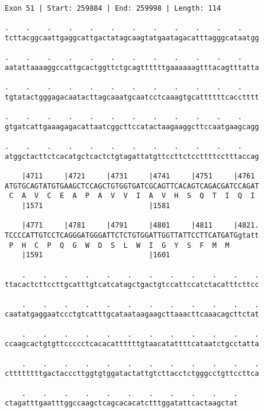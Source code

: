 \documentclass{article}
\begin{document}
\newpage
\begin{Verbatim}[fontfamily=courier]
Exon 51 | Start: 259884 | End: 259998 | Length: 114

.    .    .    .    .    .    .    .    .    .    .    .    
tcttacggcaattgaggcattgactatagcaagtatgaatagacatttagggcataatgg

.    .    .    .    .    .    .    .    .    .    .    .    
aatattaaaaggccattgcactggttctgcagttttttgaaaaaagtttacagtttatta

.    .    .    .    .    .    .    .    .    .    .    .    
tgtatactgggagacaatacttagcaaatgcaatcctcaaagtgcattttttcacctttt

.    .    .    .    .    .    .    .    .    .    .    .    
gtgatcattgaaagagacattaatcggcttccatactaagaaggcttccaatgaagcagg

.    .    .    .    .    .    .    .    .    .    .    .    
atggctacttctcacatgctcactctgtagattatgttccttctccttttcctttaccag

    |4711     |4721     |4731     |4741     |4751     |4761 
ATGTGCAGTATGTGAAGCTCCAGCTGTGGTGATCGCAGTTCACAGTCAGACGATCCAGAT
 C  A  V  C  E  A  P  A  V  V  I  A  V  H  S  Q  T  I  Q  I 
    |1571                         |1581                     

    |4771     |4781     |4791     |4801     |4811     |4821.
TCCCCATTGTCCTCAGGGATGGGATTCTCTGTGGATTGGTTATTCCTTCATGATGgtatt
 P  H  C  P  Q  G  W  D  S  L  W  I  G  Y  S  F  M  M       
    |1591                         |1601                     

    .    .    .    .    .    .    .    .    .    .    .    .
ttacactcttccttgcatttgtcatcatagctgactgtccattccatctacatttcttcc

    .    .    .    .    .    .    .    .    .    .    .    .
caatatgaggaatccctgtcatttgcataataagaagcttaaacttcaaacagcttctat

    .    .    .    .    .    .    .    .    .    .    .    .
ccaagcactgtgttccccctcacacattttttgtaacatattttcataatctgcctatta

    .    .    .    .    .    .    .    .    .    .    .    .
cttttttttgactacccttggtgtggatactattgtcttacctctgggcctgttccttca

    .    .    .    .    .    .    .    .    .    .    .
ctagatttgaatttggccaagctcagcacacatctttggatattcactaagctat
\end{Verbatim}
\newpage
\end{document}
